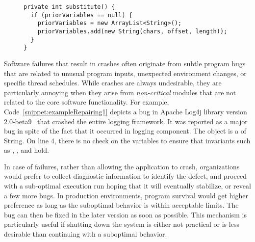 

\lstset{language=Java , caption=Apache Log4j bug example.,
label=snippet:exampleRepairing1}
\begin{figure}[t]
\begin{lstlisting}
private int substitute() {
  if (priorVariables == null) {
    priorVariables = new ArrayList<String>();
    priorVariables.add(new String(chars, offset, length));
  }
}
\end{lstlisting}
\end{figure}

Software failures that result in crashes often originate from subtle program
bugs that are related to unusual program inputs, unexpected environment changes,
or specific thread schedules. While crashes are always undesirable, they are
particularly annoying when they arise from \textit{non-critical} modules that
are not related to the core software functionality. For example,
Code~\ref{snippet:exampleRepairing1} depicts a bug in Apache Log4j library
version 2.0-beta9~\cite{ApacheLog4jBug} that crashed the entire logging
framework. It was reported as a major bug in spite of the fact that it occurred
in logging component. The object  is a  of
String. On line 4, there is no check on the variables to ensure that invariants
such as , , and
 hold.

In case of failures, rather than allowing the application to crash,
organizations would prefer to collect diagnostic information to identify the
defect, and proceed with a sub-optimal execution run hoping that it will
eventually stabilize, or reveal a few more bugs. In production environments,
program survival would get higher preference as long as the suboptimal behavior
is within acceptable limits. The bug can then be fixed in the later version as
soon as possible. This mechanism is particularly useful if shutting down the
system is either not practical or is less desirable than continuing with a
suboptimal behavior.

